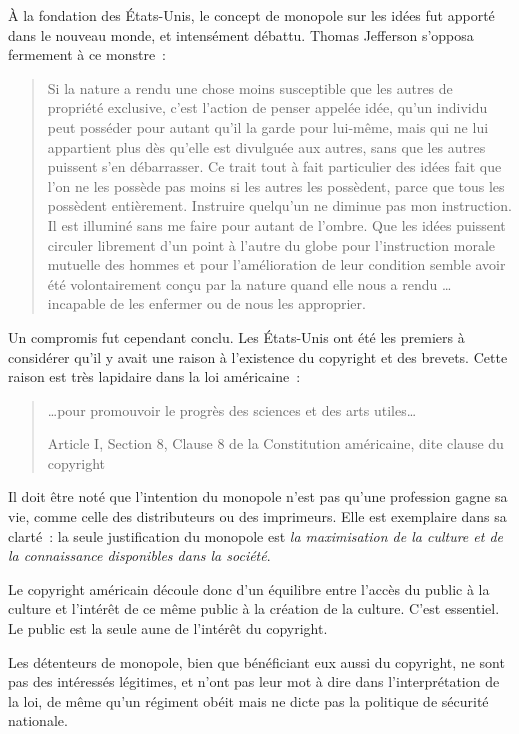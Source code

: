 À la fondation des États-Unis, le concept de monopole sur les idées fut apporté dans le nouveau monde, et intensément débattu. Thomas Jefferson s'opposa
fermement à ce monstre~:
\begin{quotation}
Si la nature a rendu une chose moins susceptible que les autres de propriété exclusive, c'est l'action de penser appelée idée, qu'un individu peut posséder pour autant qu'il la garde pour lui-même,
mais qui ne lui appartient plus dès qu'elle est divulguée aux autres, sans que les autres puissent s'en débarrasser. Ce trait tout à fait particulier des idées fait que l'on ne les possède pas moins
si les autres les possèdent, parce que tous les possèdent entièrement. Instruire quelqu'un ne diminue pas mon instruction. Il est illuminé sans me faire pour autant de l'ombre. Que les idées puissent
circuler librement d'un point à l'autre du globe pour l'instruction morale mutuelle des hommes et pour l'amélioration de leur condition semble avoir été volontairement conçu par la nature quand
elle nous a rendu … incapable de les enfermer ou de nous les approprier.
\end{quotation}

Un compromis fut cependant conclu. Les États-Unis ont été les premiers à considérer qu'il y avait une raison à l'existence du copyright et des brevets. Cette raison est très lapidaire dans la loi
américaine~:

\begin{quotation}
 …pour promouvoir le progrès des sciences et des arts utiles…

Article I, Section 8, Clause 8 de la Constitution américaine, dite clause du copyright
\end{quotation}

Il doit être noté que l'intention du monopole n'est pas qu'une profession gagne sa vie, comme celle des distributeurs ou des imprimeurs. Elle est exemplaire dans sa clarté~: la seule justification du
monopole est \emph{la maximisation de la culture et de la connaissance disponibles dans la société}.

Le copyright américain découle donc d'un équilibre entre l'accès du public à la culture et l'intérêt de ce même public à la création de la culture. C'est essentiel. Le public
est la seule aune de l'intérêt du copyright. 

Les détenteurs de monopole, bien que bénéficiant eux aussi du copyright, ne sont pas des intéressés légitimes, et n'ont pas leur mot à dire dans
l'interprétation de la loi, de même qu'un régiment obéit mais ne dicte pas la politique de sécurité nationale. 


